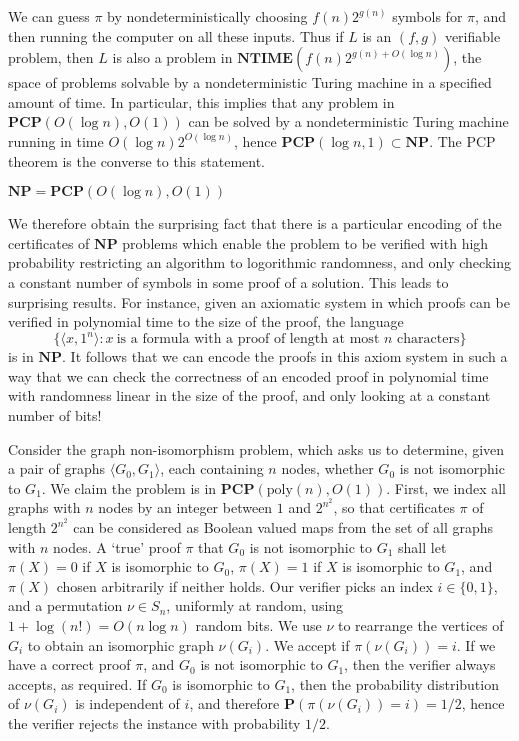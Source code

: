 We can guess $\pi$ by nondeterministically choosing $f(n)2^{g(n)}$ symbols for $\pi$, and then running the computer on all these inputs. Thus if $L$ is an $(f,g)$ verifiable problem, then $L$ is also a problem in $\mathbf{NTIME}(f(n)2^{g(n) + O(\log n)})$, the space of problems solvable by a nondeterministic Turing machine in a specified amount of time. In particular, this implies that any problem in $\mathbf{PCP}(O(\log n), O(1))$ can be solved by a nondeterministic Turing machine running in time $O(\log n) 2^{O(\log n)}$, hence $\mathbf{PCP}(\log n, 1) \subset \mathbf{NP}$. The PCP theorem is the converse to this statement.

\begin{theorem}
    $\mathbf{NP} = \mathbf{PCP}(O(\log n), O(1))$
\end{theorem}

We therefore obtain the surprising fact that there is a particular encoding of the certificates of $\mathbf{NP}$ problems which enable the problem to be verified with high probability restricting an algorithm to logorithmic randomness, and only checking a constant number of symbols in some proof of a solution. This leads to surprising results. For instance, given an axiomatic system in which proofs can be verified in polynomial time to the size of the proof, the language
%
\[ \{ \langle x, 1^n \rangle : x\ \text{is a formula with a proof of length at most $n$ characters} \} \]
%
is in $\mathbf{NP}$. It follows that we can encode the proofs in this axiom system in such a way that we can check the correctness of an encoded proof in polynomial time with randomness linear in the size of the proof, and only looking at a constant number of bits!

\begin{example}
    Consider the graph non-isomorphism problem, which asks us to determine, given a pair of graphs $\langle G_0, G_1 \rangle$, each containing $n$ nodes, whether $G_0$ is not isomorphic to $G_1$. We claim the problem is in $\mathbf{PCP}(\text{poly}(n),O(1))$. First, we index all graphs with $n$ nodes by an integer between $1$ and $2^{n^2}$, so that certificates $\pi$ of length $2^{n^2}$ can be considered as Boolean valued maps from the set of all graphs with $n$ nodes. A `true' proof $\pi$ that $G_0$ is not isomorphic to $G_1$ shall let $\pi(X) = 0$ if $X$ is isomorphic to $G_0$, $\pi(X) = 1$ if $X$ is isomorphic to $G_1$, and $\pi(X)$ chosen arbitrarily if neither holds. Our verifier picks an index $i \in \{ 0,1 \}$, and a permutation $\nu \in S_n$, uniformly at random, using $1 + \log(n!) = O(n \log n)$ random bits. We use $\nu$ to rearrange the vertices of $G_i$ to obtain an isomorphic graph $\nu(G_i)$. We accept if $\pi(\nu(G_i)) = i$. If we have a correct proof $\pi$, and $G_0$ is not isomorphic to $G_1$, then the verifier always accepts, as required. If $G_0$ is isomorphic to $G_1$, then the probability distribution of $\nu(G_i)$ is independent of $i$, and therefore $\mathbf{P}(\pi(\nu(G_i)) = i) = 1/2$, hence the verifier rejects the instance with probability $1/2$.
\end{example}

